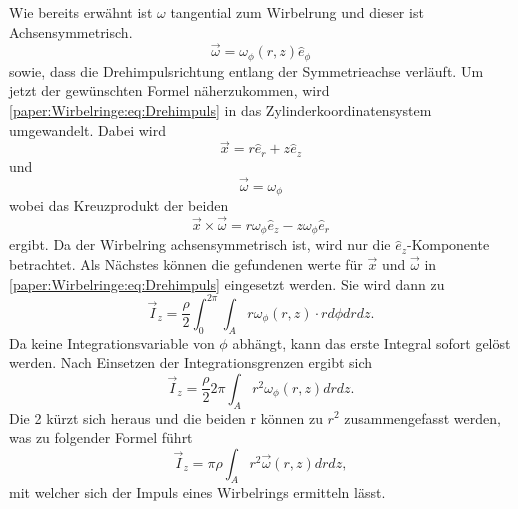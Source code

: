 Wie bereits erwähnt ist $\omega$ tangential zum Wirbelrung und dieser ist Achsensymmetrisch.
\begin{equation*}
    \vec{\omega}
    =
    \omega_\phi(r,z)\hat{e}_\phi
\end{equation*}
sowie, dass die Drehimpulsrichtung entlang der Symmetrieachse verläuft.
Um jetzt der gewünschten Formel näherzukommen, wird \eqref{paper:Wirbelringe:eq:Drehimpuls} in das Zylinderkoordinatensystem umgewandelt.
Dabei wird
\begin{equation*}
    \vec{x}
    =
    r\hat{e}_r + z\hat{e}_z
\end{equation*}
und
\begin{equation*}
    \vec{\omega}
    =
    \omega_\phi
\end{equation*}
wobei das Kreuzprodukt der beiden 
\begin{equation*}
    \vec{x}\times\vec{\omega}
    =
    r\omega_\phi\hat{e}_z - z\omega_\phi\hat{e}_r
\end{equation*}
ergibt. Da der Wirbelring achsensymmetrisch ist, wird nur die $\hat{e}_z$-Komponente betrachtet.
Als Nächstes können die gefundenen werte für $\vec{x}$ und $\vec{\omega}$ in \eqref{paper:Wirbelringe:eq:Drehimpuls} eingesetzt werden.
Sie wird dann zu
\begin{equation*}
    \vec{I}_z
    =
    \frac{\rho}{2}\int_{0}^{2\pi}\int_{A}r\omega_\phi(r,z)\cdot rd\phi drdz.
\end{equation*}
Da keine Integrationsvariable von $\phi$ abhängt, kann das erste Integral sofort gelöst werden. Nach Einsetzen der Integrationsgrenzen ergibt sich
\begin{equation*}
    \vec{I}_z
    =
    \frac{\rho}{2}2\pi\int_{A}r^2\omega_\phi(r,z)drdz.
\end{equation*}
Die 2 kürzt sich heraus und die beiden r können zu $r^2$ zusammengefasst werden, was zu folgender Formel führt
\begin{equation}
    \vec{I}_z
    =
    \pi\rho\int_{A}r^2\vec{\omega}(r,z)drdz
    \label{paper:Wirbelringe:eq:achssymImp},
\end{equation}
mit welcher sich der Impuls eines Wirbelrings ermitteln lässt.

